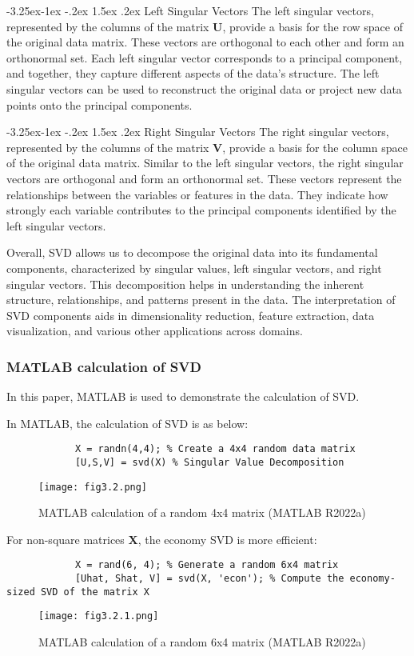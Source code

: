 \documentclass[a4paper]{article}
\makeatletter
\newcounter {subsubsubsection}[subsubsection]
\newcommand\subsubsubsection{\@startsection{subsubsubsection}{4}{\z@}%
	{-3.25ex\@plus -1ex \@minus -.2ex}%
	{1.5ex \@plus .2ex}%
	{\normalfont\normalsize\bfseries}}
\makeatother
\begin{document}
{		\subsubsubsection{Left Singular Vectors}
		The left singular vectors, represented by the columns of the matrix $\mathbf{U}$, provide a basis for the row space of the original data matrix. These vectors are orthogonal to each other and form an orthonormal set. Each left singular vector corresponds to a principal component, and together, they capture different aspects of the data's structure. The left singular vectors can be used to reconstruct the original data or project new data points onto the principal components.
		
		\subsubsubsection{Right Singular Vectors}
		The right singular vectors, represented by the columns of the matrix $\mathbf{V}$, provide a basis for the column space of the original data matrix. Similar to the left singular vectors, the right singular vectors are orthogonal and form an orthonormal set. These vectors represent the relationships between the variables or features in the data. They indicate how strongly each variable contributes to the principal components identified by the left singular vectors.
		
		Overall, SVD allows us to decompose the original data into its fundamental components, characterized by singular values, left singular vectors, and right singular vectors. This decomposition helps in understanding the inherent structure, relationships, and patterns present in the data. The interpretation of SVD components aids in dimensionality reduction, feature extraction, data visualization, and various other applications across domains.
		
		
		
		
		\subsubsection{MATLAB calculation of SVD}
		In this paper, MATLAB is used to demonstrate the calculation of SVD.
		
		
		In MATLAB, the calculation of SVD is as below:
		\begin{lstlisting}
			X = randn(4,4); % Create a 4x4 random data matrix
			[U,S,V] = svd(X) % Singular Value Decomposition
		\end{lstlisting}
		
		\begin{figure}[H]
			\centering
			\texttt{[image: fig3.2.png]}
			\caption[MATLAB output for the previous command line]{MATLAB calculation of a random 4x4 matrix (MATLAB R2022a)\protect}
			\label{fig:example}
		\end{figure}
		\newpage
		For non-square matrices \textbf{X}, the economy SVD is more efficient:
		\begin{lstlisting}  
			X = rand(6, 4); % Generate a random 6x4 matrix
			[Uhat, Shat, V] = svd(X, 'econ'); % Compute the economy-sized SVD of the matrix X
		\end{lstlisting}
		\begin{figure}[h!]
			\centering
			\texttt{[image: fig3.2.1.png]}
			\caption[MATLAB output for the previous command line]{MATLAB calculation of a random 6x4 matrix (MATLAB R2022a)\protect}
			\label{fig:example}
		\end{figure}
		
}
\end{document}
